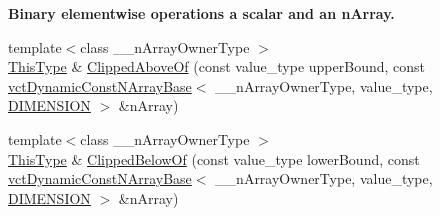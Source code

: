\begin{Indent}{\bf Binary elementwise operations a scalar and an n\+Array.}
\begin{DoxyCompactItemize}
\item 
{\footnotesize template$<$class \+\_\+\+\_\+n\+Array\+Owner\+Type $>$ }\\\hyperlink{classvct_dynamic_const_n_array_base_a5123caffcf1455a1b99003877eade897}{This\+Type} \& \hyperlink{classvct_dynamic_n_array_base_a2ee56f18dc63865f365fc21cbd77e05b}{Clipped\+Above\+Of} (const value\+\_\+type upper\+Bound, const \hyperlink{classvct_dynamic_const_n_array_base}{vct\+Dynamic\+Const\+N\+Array\+Base}$<$ \+\_\+\+\_\+n\+Array\+Owner\+Type, value\+\_\+type, \hyperlink{classvct_dynamic_n_array_base_aa66532d28588bdf26d08fb593db815d6abfcde386ec801b212d7c42d63a4f3837}{D\+I\+M\+E\+N\+S\+I\+O\+N} $>$ \&n\+Array)
\item 
{\footnotesize template$<$class \+\_\+\+\_\+n\+Array\+Owner\+Type $>$ }\\\hyperlink{classvct_dynamic_const_n_array_base_a5123caffcf1455a1b99003877eade897}{This\+Type} \& \hyperlink{classvct_dynamic_n_array_base_a038868f294bb911f8f6e9facd475da23}{Clipped\+Below\+Of} (const value\+\_\+type lower\+Bound, const \hyperlink{classvct_dynamic_const_n_array_base}{vct\+Dynamic\+Const\+N\+Array\+Base}$<$ \+\_\+\+\_\+n\+Array\+Owner\+Type, value\+\_\+type, \hyperlink{classvct_dynamic_n_array_base_aa66532d28588bdf26d08fb593db815d6abfcde386ec801b212d7c42d63a4f3837}{D\+I\+M\+E\+N\+S\+I\+O\+N} $>$ \&n\+Array)
\end{DoxyCompactItemize}
\end{Indent}
